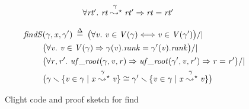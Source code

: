 \begin{figure}[t]
{\begin{flushleft}
\begin{minipage}[c]{0.46\textwidth}
\begin{equation*}
\begin{array}{@{}l@{}lcl@{}}
& \multicolumn{3}{@{}l}{\forall \m{rt'}.~\m{rt} \mathrel{{\stackrel{\gamma~}{\leadsto^{\star}}}} \m{rt'} => \m{rt} = \m{rt'}}
\end{array}
\end{equation*}
\end{minipage}
\vline
\begin{minipage}[c]{0.5\textwidth}
\vspace*{-1ex}
\begin{equation*}
\begin{split}
\quad \m{findS}&(\gamma,\m{x},\gamma') \; \defeq \; \big(\forall \m{v}.~ \m{v}\in\m{V}(\gamma) <=> \m{v}\in\m{V}(\gamma') \big) /| \null \\ 
&\big(\forall \m{v}.~\m{v}\in\m{V}(\gamma) => \gamma(\m{v}).\m{rank} = \gamma'(\m{v}).\m{rank} \big) /| \null \\
&\big(\forall \m{r},\m{r'}.~\m{uf\_root}(\gamma, \m{v}, \m{r}) => \m{uf\_root}(\gamma', \m{v}, \m{r'}) => \m{r} = \m{r'} \big) /|  \null \\ 
&\big(\gamma \smallsetminus \{\m{v} \in \gamma \mid \m{x} \mathrel{{\stackrel{\gamma~}{\leadsto^{\star}}}} \m{v}\} \cong \gamma' \smallsetminus \{\m{v} \in \gamma \mid \m{x} \mathrel{{\stackrel{\gamma~}{\leadsto^{\star}}}} \m{v}\}\big)
\end{split}
\end{equation*}
\end{minipage}
\end{flushleft}
}





\vspace{-0.4em}
\caption{Clight code and proof sketch for find}
\label{fig:find}
\vspace{-1em}
\end{figure}
